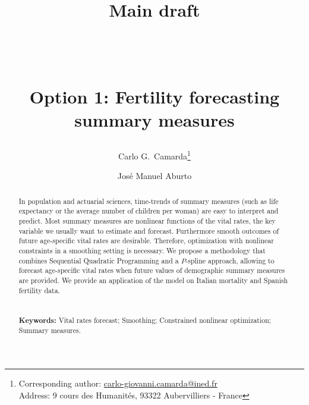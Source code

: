 \documentclass[12pt,a4paper,twoside]{article}
\begin{document}
	
\title{\normalsize{Main draft}\\
	$\,$\\	$\,$\\
	\begin{Huge}
		Option 1: Fertility forecasting summary measures
	\end{Huge}}


	\author[1]{Carlo G.~Camarda\thanks{Corresponding author: \url{carlo-giovanni.camarda@ined.fr}\\
		\hspace*{1.8em}Address: 9 cours des Humanités, 93322 Aubervilliers - France}}
\author[2]{Jos\'e Manuel Aburto}


\date{}
\maketitle
\thispagestyle{empty}

\pagestyle{fancy}
\fancyhead[RO,LE]{\small}
\fancyfoot[L,R,C]{}
\rfoot{\thepage}

	
	
	\begin{abstract}
In population and actuarial sciences, time-trends of summary measures (such as life expectancy or the average number of children per woman) are easy to interpret and predict. Most summary measures are nonlinear functions of the vital rates, the key variable we usually want to estimate and forecast. Furthermore smooth outcomes of future age-specific vital rates are desirable. Therefore, optimization with nonlinear constraints in a smoothing setting is necessary. We propose a methodology that combines Sequential Quadratic Programming and a $P$-spline approach, allowing to forecast age-specific vital rates when future values of demographic summary measures are provided. We provide an application of the model on Italian mortality and Spanish fertility data.
\\
\\$\,$\\
{\bf Keywords:} Vital rates forecast; Smoothing; Constrained nonlinear optimization; Summary measures.
	\end{abstract}
	
\end{document}
